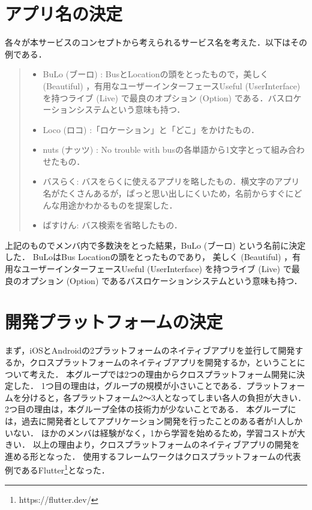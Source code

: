 \section{アプリ名の決定}
各々が本サービスのコンセプトから考えられるサービス名を考えた．以下はその例である．
\begin{quote}
    \begin{itemize}
        \item BuLo (ブーロ) : BusとLocationの頭をとったもので，美しく (Beautiful) ，有用なユーザーインターフェースUseful (UserInterface) を持つライブ (Live) で最良のオプション (Option) である．バスロケーションシステムという意味も持つ．
        \item Loco (ロコ) :「ロケーション」と「どこ」をかけたもの．
        \item nuts (ナッツ) : No trouble with busの各単語から1文字とって組み合わせたもの．
        \item バスらく: バスをらくに使えるアプリを略したもの．横文字のアプリ名がたくさんあるが，ぱっと思い出しにくいため，名前からすぐにどんな用途かわかるものを提案した．
        \item ばすけん: バス検索を省略したもの．
    \end{itemize}
\end{quote}
上記のものでメンバ内で多数決をとった結果，BuLo (ブーロ) という名前に決定した．
BuLoはBus Locationの頭をとったものであり，
美しく (Beautiful) ，有用なユーザーインターフェースUseful (UserInterface) を持つライブ (Live) で最良のオプション (Option) であるバスロケーションシステムという意味も持つ．

\section{開発プラットフォームの決定}
まず，iOSとAndroidの2プラットフォームのネイティブアプリを並行して開発するか，クロスプラットフォームのネイティブアプリを開発するか，ということについて考えた．
本グループでは2つの理由からクロスプラットフォーム開発に決定した．
1つ目の理由は，グループの規模が小さいことである．プラットフォームを分けると，各プラットフォーム2〜3人となってしまい各人の負担が大きい．
2つ目の理由は，本グループ全体の技術力が少ないことである．
本グループには，過去に開発者としてアプリケーション開発を行ったことのある者が1人しかいない．
ほかのメンバは経験がなく，1から学習を始めるため，学習コストが大きい．
以上の理由より，クロスプラットフォームのネイティブアプリの開発を進める形となった．
使用するフレームワークはクロスプラットフォームの代表例であるFlutter\footnote{https://flutter.dev/}となった．

